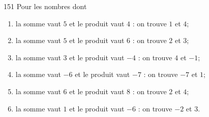 \begin{Soln}{151}
Pour les nombres dont
\begin{enumerate}
\item la somme vaut $5$ et le produit vaut $4$ : on trouve $1$ et $4$;
\item la somme vaut $5$ et le produit vaut $6$ : on trouve $2$ et $3$;
\item la somme vaut $3$ et le produit vaut $-4$ : on trouve $4$ et $-1$;
\item la somme vaut $-6$ et le produit vaut $-7$ : on trouve $-7$ et $1$;
\item la somme vaut $6$ et le produit vaut $8$ : on trouve $2$ et $4$;
\item la somme vaut $1$ et le produit vaut $-6$ : on trouve $-2$ et $3$.
\end{enumerate}
\end{Soln}

